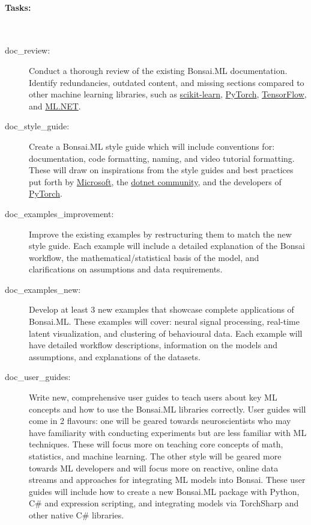 \paragraph{Tasks:}\mbox{}\\

\begin{description}

    \item[doc\_review:] Conduct a thorough review of the existing Bonsai.ML documentation. Identify redundancies, outdated content, and missing sections compared to other machine learning libraries, such as \href{https://scikit-learn.org/stable/documentation.html}{scikit-learn}, \href{https://pytorch.org/docs/stable/index.html}{PyTorch}, \href{https://tensorflow.org/learn}{TensorFlow}, and \href{https://docs.microsoft.com/en-us/dotnet/machine-learning/}{ML.NET}.

    \item[doc\_style\_guide:] Create a Bonsai.ML style guide which will include conventions for: documentation, code formatting, naming, and video tutorial formatting. These will draw on inspirations from the style guides and best practices put forth by \href{https://learn.microsoft.com/en-us/dotnet/csharp/fundamentals/coding-style/coding-conventions}{Microsoft}, the \href{https://github.com/dotnet/runtime/blob/main/docs/coding-guidelines/coding-style.md}{dotnet community}, and the developers of \href{https://github.com/pytorch/pytorch/blob/main/CONTRIBUTING.md}{PyTorch}.
    
    \item[doc\_examples\_improvement:] Improve the existing examples by restructuring them to match the new style guide. Each example will include a detailed explanation of the Bonsai workflow, the mathematical/statistical basis of the model, and clarifications on assumptions and data requirements.

    \item[doc\_examples\_new:] Develop at least 3 new examples that showcase complete applications of Bonsai.ML. These examples will cover: neural signal processing, real-time latent visualization, and clustering of behavioural data. Each example will have detailed workflow descriptions, information on the models and assumptions, and explanations of the datasets.

    \item[doc\_user\_guides:] Write new, comprehensive user guides to teach users about key ML concepts and how to use the Bonsai.ML libraries correctly. User guides will come in 2 flavours: one will be geared towards neuroscientists who may have familiarity with conducting experiments but are less familiar with ML techniques. These will focus more on teaching core concepts of math, statistics, and machine learning. The other style will be geared more towards ML developers and will focus more on reactive, online data streams and approaches for integrating ML models into Bonsai. These user guides will include how to create a new Bonsai.ML package with Python, C\# and expression scripting, and integrating models via TorchSharp and other native C\# libraries.
    

\end{description}
